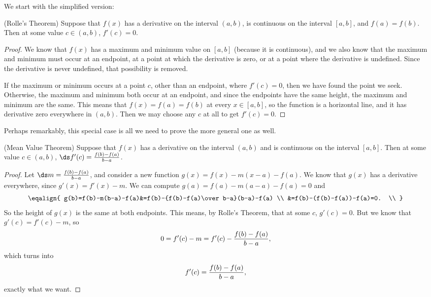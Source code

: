 We start with the simplified version:

\begin{theorem} (Rolle's Theorem) Suppose that $f(x)$ has a derivative on the
interval $(a,b)$, is continuous on the interval $[a,b]$, and
$f(a)=f(b)$. Then at some value $c\in (a,b)$, $f'(c)=0$.
\label{thm:rolle}

\begin{proof}
We know that $f(x)$ has a maximum and minimum value on $[a,b]$
(because it is continuous), and we
also know that the maximum and minimum must occur at an endpoint, at a
point at which the derivative is zero, or at a point where the
derivative is undefined. Since the derivative is never undefined, that
possibility is removed.

If the maximum or minimum occurs at a point $c$, other than an endpoint,
where $f'(c)=0$, then we have found the point we seek. Otherwise, the
maximum and minimum both occur at an endpoint, and since the endpoints
have the same height, the maximum and minimum are the same. This means
that $f(x)=f(a)=f(b)$ at every $x \in [a,b]$, so the function is a
horizontal line, and it has derivative zero everywhere in
$(a,b)$. Then we may choose any $c$ at all to get $f'(c)=0$.
\end{proof}

Perhaps remarkably, this special case is all we need to prove the more
general one as well.

\begin{theorem} (Mean Value Theorem) 
\label{thm:mvt}
Suppose that $f(x)$ has a derivative on the
interval $(a,b)$ and is continuous on the interval $[a,b]$. 
Then at some value
$c\in (a,b)$, $\ds f'(c)={f(b)-f(a)\over b-a}$.

\begin{proof}
Let $\ds m={f(b)-f(a)\over b-a}$, and consider a new function
$g(x)=f(x) - m(x-a)-f(a)$. We know that $g(x)$ has a derivative
everywhere, since $g'(x)=f'(x)-m$. We can compute 
$g(a)=f(a)- m(a-a)-f(a) =0$ and
$$\eqalign{
g(b)=f(b)-m(b-a)-f(a)&=f(b)-{f(b)-f(a)\over b-a}(b-a)-f(a) \\
&=f(b)-(f(b)-f(a))-f(a)=0. \\
}$$
So the height of $g(x)$ is the same at both endpoints. This means, by
Rolle's Theorem, that at some $c$, $g'(c)=0$. But we know that
$g'(c)=f'(c)-m$, so
$$0=f'(c)-m=f'(c)-{f(b)-f(a)\over b-a},$$
which turns into
$$f'(c)={f(b)-f(a)\over b-a},$$
exactly what we want.
\end{proof}


\end{theorem}
\end{theorem}
